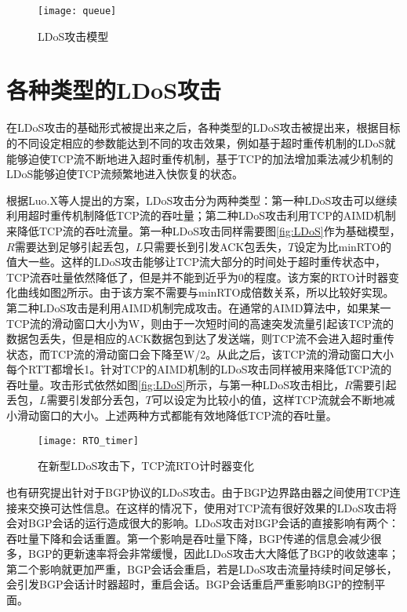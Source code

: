\begin{figure}
    \centering
    \texttt{[image: queue]}
    \caption{LDoS攻击模型}
    \label{fig:model}
\end{figure}

\section{各种类型的LDoS攻击}
\label{chap3:LDoStypes}
在LDoS攻击的基础形式被提出来之后，各种类型的LDoS攻击被提出来，根据目标的不同设定相应的参数能达到不同的攻击效果，例如基于超时重传机制的LDoS就能够迫使TCP流不断地进入超时重传机制，基于TCP的加法增加乘法减少机制的LDoS能够迫使TCP流频繁地进入快恢复的状态。

根据Luo.X\cite{Luo2005OnAN}等人提出的方案，LDoS攻击分为两种类型：第一种LDoS攻击可以继续利用超时重传机制降低TCP流的吞吐量；第二种LDoS攻击利用TCP的AIMD机制来降低TCP流的吞吐流量。第一种LDoS攻击同样需要图\ref{fig:LDoS}作为基础模型，$R$需要达到足够引起丢包，$L$只需要长到引发ACK包丢失，$T$设定为比minRTO的值大一些。这样的LDoS攻击能够让TCP流大部分的时间处于超时重传状态中，TCP流吞吐量依然降低了，但是并不能到近乎为0的程度。该方案的RTO计时器变化曲线如图\ref{fig:rto-timer-1}所示。由于该方案不需要与minRTO成倍数关系，所以比较好实现。第二种LDoS攻击是利用AIMD机制完成攻击。在通常的AIMD算法中，如果某一TCP流的滑动窗口大小为W，则由于一次短时间的高速突发流量引起该TCP流的数据包丢失，但是相应的ACK数据包到达了发送端，则TCP流不会进入超时重传状态，而TCP流的滑动窗口会下降至W/2。从此之后，该TCP流的滑动窗口大小每个RTT都增长1。针对TCP的AIMD机制的LDoS攻击同样被用来降低TCP流的吞吐量。攻击形式依然如图\ref{fig:LDoS}所示，与第一种LDoS攻击相比，$R$需要引起丢包，$L$需要引发部分丢包，$T$可以设定为比较小的值，这样TCP流就会不断地减小滑动窗口的大小。上述两种方式都能有效地降低TCP流的吞吐量。

\begin{figure}
    \centering
    \texttt{[image: RTO\_timer]}
    \caption{在新型LDoS攻击下，TCP流RTO计时器变化}
    \label{fig:rto-timer-1}
\end{figure}

也有研究\cite{b2}提出针对于BGP协议的LDoS攻击。由于BGP边界路由器之间使用TCP连接来交换可达性信息。在这样的情况下，使用对TCP流有很好效果的LDoS攻击将会对BGP会话的运行造成很大的影响。LDoS攻击对BGP会话的直接影响有两个：吞吐量下降和会话重置。第一个影响是吞吐量下降，BGP传递的信息会减少很多，BGP的更新速率将会非常缓慢，因此LDoS攻击大大降低了BGP的收敛速率；第二个影响就更加严重，BGP会话会重启，若是LDoS攻击流量持续时间足够长，会引发BGP会话计时器超时，重启会话。BGP会话重启严重影响BGP的控制平面。


